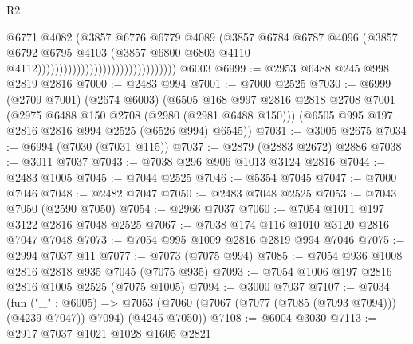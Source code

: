 \begin{lexlean}{R2}
\begin{coremodule}
                                                            @6771
                                                            @4082
                                                            (@3857
                                                              @6776
                                                              @6779
                                                              @4089
                                                              (@3857
                                                                @6784
                                                                @6787
                                                                @4096
                                                                (@3857
                                                                  @6792
                                                                  @6795
                                                                  @4103
                                                                  (@3857
                                                                    @6800
                                                                    @6803
                                                                    @4110
                                                                    @4112))))))))))))))))))))))))))))))))
    @6003
@6999 := @2953 @6488 @245 @998 @2819 @2816
@7000 := @2483 @994
@7001 := @7000 @2525
@7030 := @6999
    (@2709 @7001)
    (@2674 @6003)
    (@6505
      @168
      @997
      @2816
      @2818
      @2708
      @7001
      (@2975 @6488 @150 @2708 (@2980 (@2981 @6488 @150)))
      (@6505 @995 @197 @2816 @2816 @994 @2525 (@6526 @994) @6545))
@7031 := @3005 @2675
@7034 := @6994 (@7030 (@7031 @115))
@7037 := @2879 (@2883 @2672) @2886
@7038 := @3011 @7037
@7043 := @7038 @296 @906 @1013 @3124 @2816
@7044 := @2483 @1005
@7045 := @7044 @2525
@7046 := @5354 @7045
@7047 := @7000 @7046
@7048 := @2482 @7047
@7050 := @2483 @7048 @2525
@7053 := @7043 @7050 (@2590 @7050)
@7054 := @2966 @7037
@7060 := @7054 @1011 @197 @3122 @2816 @7048 @2525
@7067 := @7038 @174 @116 @1010 @3120 @2816 @7047 @7048
@7073 := @7054 @995 @1009 @2816 @2819 @994 @7046
@7075 := @2994 @7037 @11
@7077 := @7073 (@7075 @994)
@7085 := @7054 @936 @1008 @2816 @2818 @935 @7045 (@7075 @935)
@7093 := @7054 @1006 @197 @2816 @2816 @1005 @2525 (@7075 @1005)
@7094 := @3000 @7037
@7107 := @7034
    (fun ("_" : @6005) =>
    @7053 (@7060 (@7067 (@7077 (@7085 (@7093 @7094))) (@4239 @7047)) @7094) (@4245 @7050))
@7108 := @6004 @3030
@7113 := @2917 @7037 @1021 @1028 @1605 @2821

\end{coremodule}
\end{lexlean}
